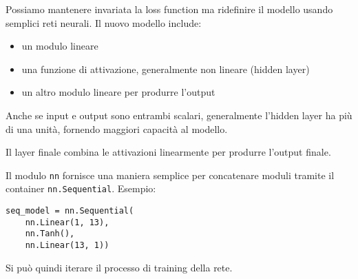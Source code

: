 Possiamo mantenere invariata la loss function ma ridefinire il modello usando semplici reti neurali. Il nuovo modello include: 
\begin{itemize}
    \item un modulo lineare
    
    \item una funzione di attivazione, generalmente non lineare (hidden layer)
    
    \item un altro modulo lineare per produrre l'output
\end{itemize}

Anche se input e output sono entrambi scalari, generalmente l'hidden layer ha più di una unità, fornendo maggiori capacità al modello.

Il layer finale combina le attivazioni linearmente per produrre l'output finale.

Il modulo \texttt{nn} fornisce una maniera semplice per concatenare moduli tramite il container \texttt{nn.Sequential}. Esempio: 
\begin{verbatim}
seq_model = nn.Sequential(
    nn.Linear(1, 13),
    nn.Tanh(),
    nn.Linear(13, 1))
\end{verbatim}

Si può quindi iterare il processo di training della rete.